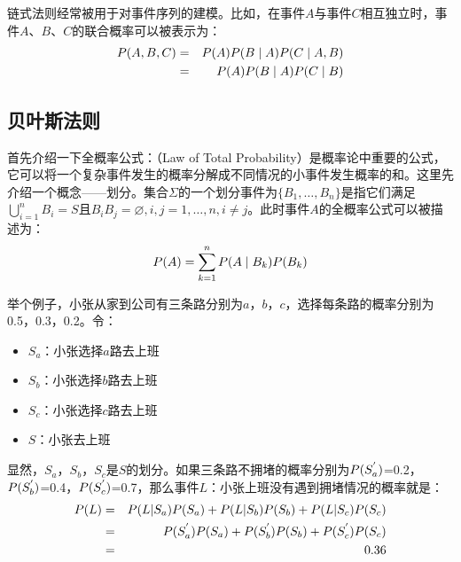 \parinterval 链式法则经常被用于对事件序列的建模。比如，在事件$A$与事件$C$相互独立时，事件$A$、$B$、$C$的联合概率可以被表示为：
\begin{eqnarray}
{P}(A,B,C) & = & {P}(A){P}(B \mid A){P}(C \mid A,B) \nonumber \\
                & = & {P}(A){P}(B \mid A){P}(C \mid B)
\label{eq:chain-rule-example}
\end{eqnarray}


\subsection{贝叶斯法则}\label{sec:2.2.3}

\parinterval 首先介绍一下全概率公式：{\small{}}（Law of Total Probability）是概率论中重要的公式，它可以将一个复杂事件发生的概率分解成不同情况的小事件发生概率的和。这里先介绍一个概念——划分。集合$\Sigma$的一个划分事件为$\{B_1, \ldots ,B_n\}$是指它们满足$\bigcup_{i=1}^n B_i=S \textrm{且}B_iB_j=\varnothing , i,j=1, \ldots ,n,i\neq j$。此时事件$A$的全概率公式可以被描述为：
\begin{eqnarray}
{P}(A)=\sum_{k=1}^n {P}(A \mid B_k){P}(B_k)
\label{eq:2-9}
\end{eqnarray}

\parinterval 举个例子，小张从家到公司有三条路分别为$a$，$b$，$c$，选择每条路的概率分别为0.5，0.3，0.2。令：

\begin{itemize}
\vspace{0.5em}
\item $S_a$：小张选择$a$路去上班
\vspace{0.5em}
\item $S_b$：小张选择$b$路去上班
\vspace{0.5em}
\item $S_c$：小张选择$c$路去上班
\vspace{0.5em}
\item $S$：小张去上班
\vspace{0.5em}
\end{itemize}

\parinterval 显然，$S_a$，$S_b$，$S_c$是$S$的划分。如果三条路不拥堵的概率分别为${P}({S_{a}^{'}})$=0.2， ${P}({S_{b}^{'}})$=0.4，${P}({S_{c}^{'}})$=0.7，那么事件$L$：小张上班没有遇到拥堵情况的概率就是：
\begin{eqnarray}
{{P}(L)} &=& {{P}( L| S_a ){P}(S_a )+{P}( L| S_b ){P}(S_b )+{P}( L| S_c ){P}(S_c )}\nonumber \\
& = &{{P}({S_{a}^{'}}){P}(S_a)+{P}({S_{b}^{'}}){P}(S_b)+{P}({S_{c}^{'}}){P}(S_c) }\nonumber \\
& = &{0.36}
\label{eq:2-10}
\end{eqnarray}

